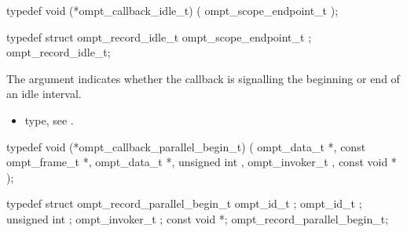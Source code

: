 \label{sec:ompt_callback_idle_t}
\format

\begin{ccppspecific}
\begin{omptCallback}
typedef void (*ompt_callback_idle_t) (
  ompt_scope_endpoint_t 
);
\end{omptCallback}
\end{ccppspecific}


\record

\begin{ccppspecific}
\begin{omptRecord}
typedef struct ompt_record_idle_t {
  ompt_scope_endpoint_t ;
} ompt_record_idle_t;
\end{omptRecord}
\end{ccppspecific}


\argdesc

The argument  indicates whether the callback is
signalling the beginning or end of an idle interval.

\crossreferences
\begin{itemize}
\item {} type, see
.
\end{itemize}



\label{sec:ompt_callback_parallel_begin_t}
\format

\begin{ccppspecific}
\begin{omptCallback}
typedef void (*ompt_callback_parallel_begin_t) (
  ompt_data_t *,
  const ompt_frame_t *,
  ompt_data_t *,
  unsigned int ,
  ompt_invoker_t ,
  const void *
);
\end{omptCallback}
\end{ccppspecific}


\record

\begin{ccppspecific}
\begin{omptRecord}
typedef struct ompt_record_parallel_begin_t {
  ompt_id_t ;
  ompt_id_t ;
  unsigned int ;
  ompt_invoker_t ;
  const void *;
} ompt_record_parallel_begin_t;
\end{omptRecord}
\end{ccppspecific}


